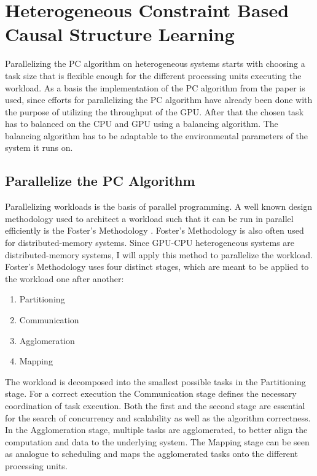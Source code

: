 \chapter{Heterogeneous Constraint Based Causal Structure Learning}
Parallelizing the PC algorithm on heterogeneous systems starts with choosing a task size that is flexible enough for the different processing units executing the workload. As a basis the implementation of the PC algorithm from the paper \cite{schmidt_order-independent_2018} is used, since efforts for parallelizing the PC algorithm have already been done with the purpose of utilizing the throughput of the GPU. After that the chosen task has to balanced on the CPU and GPU using a balancing algorithm. The balancing algorithm has to be adaptable to the environmental parameters of the system it runs on.

\section{Parallelize the PC Algorithm}
Parallelizing workloads is the basis of parallel programming. A well known design methodology used to architect a workload such that it can be run in parallel efficiently is the Foster's Methodology \cite{foster_designing_1995}. Foster's Methodology is also often used for distributed-memory systems. Since GPU-CPU heterogeneous systems are distributed-memory systems, I will apply this method to parallelize the workload. Foster's Methodology uses four distinct stages, which are meant to be applied to the workload one after another:

\begin{enumerate}
    \item Partitioning
    \item Communication
    \item Agglomeration 
    \item Mapping
\end{enumerate}

The workload is decomposed into the smallest possible tasks in the Partitioning stage. For a correct execution the Communication stage defines the necessary coordination of task execution. Both the first and the second stage are essential for the search of concurrency and scalability as well as the algorithm correctness. In the Agglomeration stage, multiple tasks are agglomerated, to better align the computation and data to the underlying system. The Mapping stage can be seen as analogue to scheduling and maps the agglomerated tasks onto the different processing units.


